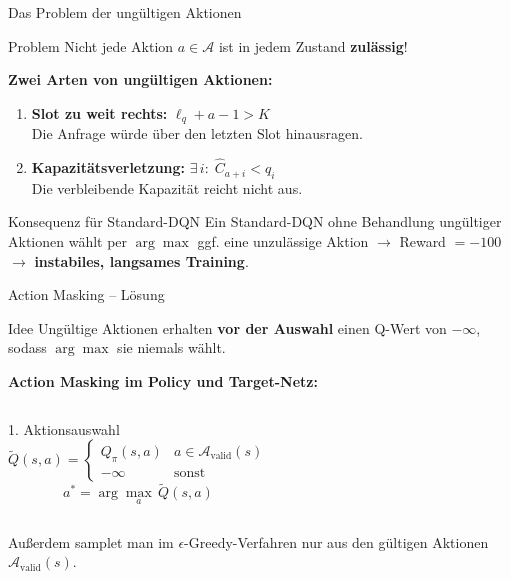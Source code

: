 \documentclass[aspectratio=169]{beamer}
\begin{document}
\begin{frame}{Das Problem der ungültigen Aktionen}

  \begin{alertblock}{Problem}
    Nicht jede Aktion $a \in \mathcal{A}$ ist in jedem Zustand \textbf{zulässig}!
  \end{alertblock}

  \bigskip
  \textbf{Zwei Arten von ungültigen Aktionen:}

  \begin{enumerate}
    \item \textbf{Slot zu weit rechts:} \quad $\ell_q + a - 1 > K$ \\
          {\small Die Anfrage würde über den letzten Slot hinausragen.}

    \bigskip
    \item \textbf{Kapazitätsverletzung:} \quad $\exists\, i:\; \hat{C}_{a+i} < q_i$ \\
          {\small Die verbleibende Kapazität reicht nicht aus.}
  \end{enumerate}

  \bigskip
  \begin{block}{Konsequenz für Standard-DQN}
    Ein Standard-DQN ohne Behandlung ungültiger Aktionen wählt per $\arg\max$ ggf.
    eine unzulässige Aktion $\rightarrow$ Reward $= -100$ $\rightarrow$
    \textbf{instabiles, langsames Training}.
  \end{block}

\end{frame}

\begin{frame}{Action Masking -- Lösung}

  \begin{block}{Idee}
    Ungültige Aktionen erhalten \textbf{vor der Auswahl} einen Q-Wert von $-\infty$,
    sodass $\arg\max$ sie niemals wählt.
  \end{block}

  \bigskip
  \textbf{Action Masking im Policy und Target-Netz:}

  \begin{columns}
      \begin{exampleblock}{1. Aktionsauswahl}
        \[
          \tilde{Q}(s,a) =
          \begin{cases}
            Q_\pi(s,a) & a \in \mathcal{A}_{\text{valid}}(s) \\
            -\infty    & \text{sonst}
          \end{cases}
        \]
        \[
          a^* = \arg\max_{a}\, \tilde{Q}(s,a)
        \]
      \end{exampleblock}
  \end{columns}
  \bigskip
  Außerdem samplet man im $\epsilon$-Greedy-Verfahren nur aus den gültigen Aktionen $\mathcal{A}_{\text{valid}}(s)$.
\end{frame}
\end{document}
